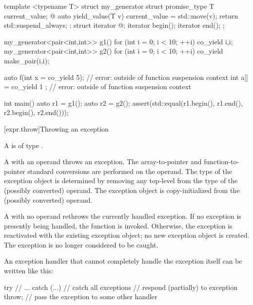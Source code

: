 \begin{example}
\begin{codeblock}
template <typename T>
struct my_generator {
  struct promise_type {
    T current_value;
    @\commentellip@
    auto yield_value(T v) {
      current_value = std::move(v);
      return std::suspend_always{};
    }
  };
  struct iterator { @\commentellip@ };
  iterator begin();
  iterator end();
};

my_generator<pair<int,int>> g1() {
  for (int i = 0; i < 10; ++i) co_yield {i,i};
}
my_generator<pair<int,int>> g2() {
  for (int i = 0; i < 10; ++i) co_yield make_pair(i,i);
}

auto f(int x = co_yield 5);     // error:  outside of function suspension context
int a[] = { co_yield 1 };       // error:  outside of function suspension context

int main() {
  auto r1 = g1();
  auto r2 = g2();
  assert(std::equal(r1.begin(), r1.end(), r2.begin(), r2.end()));
}
\end{codeblock}
\end{example}

[expr.throw]{Throwing an exception}%
%
%
%
%
\begin{bnf}
\br
      
\end{bnf}

\pnum
A  is of type .

\pnum
A  with an operand throws an
exception.
The array-to-pointer and function-to-pointer
standard conversions are performed on the operand.
The type of the exception object is determined by removing
any top-level  from the type of the
(possibly converted) operand.
The exception object is copy-initialized
from the (possibly converted) operand.

\pnum
{}%
A
with no operand rethrows the currently handled exception.
%
%
If no exception is presently being handled,
the function  is invoked.
Otherwise, the exception is reactivated with the existing exception object;
no new exception object is created.
The exception is no longer considered to be caught.
\begin{example}
An exception handler that cannot completely handle the exception itself
can be written like this:
\begin{codeblock}
try {
  // ...
} catch (...) {     // catch all exceptions
  // respond (partially) to exception
  throw;            // pass the exception to some other handler
}
\end{codeblock}
\end{example}

